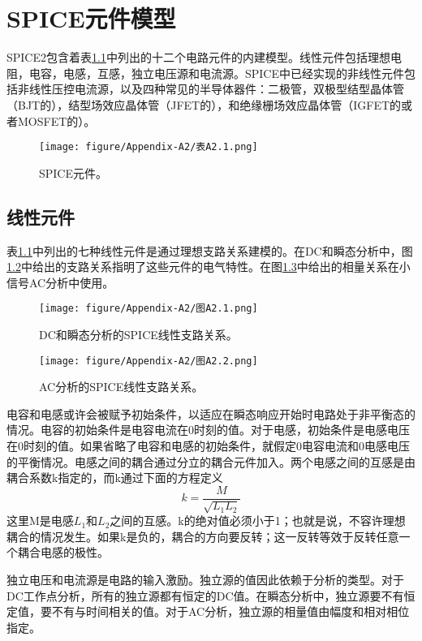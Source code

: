 \chapter{SPICE元件模型}
\label{App:2}
SPICE2包含着表\ref{表A2.1}中列出的十二个电路元件的内建模型。线性元件包括理想电阻，电容，电感，互感，独立电压源和电流源。SPICE中已经实现的非线性元件包括非线性压控电流源，以及四种常见的半导体器件：二极管，双极型结型晶体管（BJT的），结型场效应晶体管（JFET的），和绝缘栅场效应晶体管（IGFET的或者MOSFET的）。

\begin{figure}[htbp]
\small
    \centering
    \texttt{[image: figure/Appendix-A2/表A2.1.png]}
    \caption{SPICE元件。}
    \label{表A2.1}
\end{figure}

\section{线性元件}
表\ref{表A2.1}中列出的七种线性元件是通过理想支路关系建模的。在DC和瞬态分析中，图\ref{图A2.1}中给出的支路关系指明了这些元件的电气特性。在图\ref{图A2.2}中给出的相量关系在小信号AC分析中使用。

\begin{figure}[htbp]
\small
    \centering
    \texttt{[image: figure/Appendix-A2/图A2.1.png]}
    \caption{DC和瞬态分析的SPICE线性支路关系。}
    \label{图A2.1}
\end{figure}

\begin{figure}[htbp]
\small
    \centering
    \texttt{[image: figure/Appendix-A2/图A2.2.png]}
    \caption{AC分析的SPICE线性支路关系。}
    \label{图A2.2}
\end{figure}

电容和电感或许会被赋予初始条件，以适应在瞬态响应开始时电路处于非平衡态的情况。电容的初始条件是电容电流在0时刻的值。对于电感，初始条件是电感电压在0时刻的值。如果省略了电容和电感的初始条件，就假定0电容电流和0电感电压的平衡情况。电感之间的耦合通过分立的耦合元件加入。两个电感之间的互感是由耦合系数k指定的，而k通过下面的方程定义
\begin{equation}
    k = \frac{M}{\sqrt{L_1L_2}}
    \label{eq:A2.1}
\end{equation}
这里M是电感$L_1$和$L_2$之间的互感。k的绝对值必须小于1；也就是说，不容许理想耦合的情况发生。如果k是负的，耦合的方向要反转；这一反转等效于反转任意一个耦合电感的极性。

独立电压和电流源是电路的输入激励。独立源的值因此依赖于分析的类型。对于DC工作点分析，所有的独立源都有恒定的DC值。在瞬态分析中，独立源要不有恒定值，要不有与时间相关的值。对于AC分析，独立源的相量值由幅度和相对相位指定。

